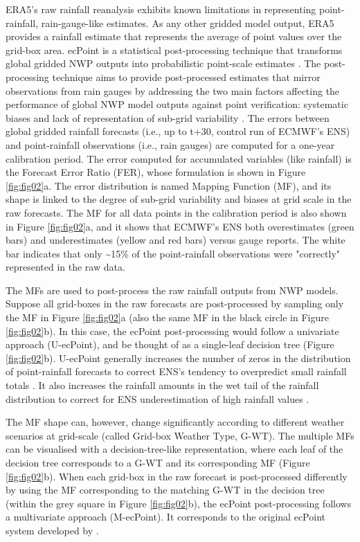 \documentclass{ametsocV6.1}
\begin{document}
ERA5's raw rainfall reanalysis exhibits known limitations in representing point-rainfall, rain-gauge-like estimates. As any other gridded model output, ERA5 provides a rainfall estimate that represents the average of point values over the grid-box area. ecPoint is a statistical post-processing technique that transforms global gridded NWP outputs into probabilistic point-scale estimates \citep{HewsonPillosu2021}. The post-processing technique aims to provide post-processed estimates that mirror observations from rain gauges by addressing the two main factors affecting the performance of global NWP model outputs against point verification: systematic biases \citep{Lavers2021} and lack of representation of sub-grid variability \citep{Gober2008}. The errors between global gridded rainfall forecasts (i.e., up to t+30, control run of ECMWF's ENS) and point-rainfall observations (i.e., rain gauges) are computed for a one-year calibration period. The error computed for accumulated variables (like rainfall) is the Forecast Error Ratio (FER), whose formulation is shown in Figure \ref{fig:fig02}a. The error distribution is named Mapping Function (MF), and its shape is linked to the degree of sub-grid variability and biases at grid scale in the raw forecasts. The MF for all data points in the calibration period is also shown in Figure \ref{fig:fig02}a, and it shows that ECMWF's ENS both overestimates (green bars) and underestimates (yellow and red bars) versus gauge reports. The white bar indicates that only \textasciitilde15\% of the point-rainfall observations were "correctly" represented in the raw data.

The MFs are used to post-process the raw rainfall outputs from NWP models. Suppose all grid-boxes in the raw forecasts are post-processed by sampling only the MF in Figure \ref{fig:fig02}a (also the same MF in the black circle in Figure \ref{fig:fig02}b). In this case, the ecPoint post-processing would follow a univariate approach (U-ecPoint), and be thought of as a single-leaf decision tree (Figure \ref{fig:fig02}b). U-ecPoint generally increases the number of zeros in the distribution of point-rainfall forecasts to correct ENS's tendency to overpredict small rainfall totals \citep{Haiden2025}. It also increases the rainfall amounts in the wet tail of the rainfall distribution to correct for ENS underestimation of high rainfall values \citep{Haiden2025}. 

The MF shape can, however, change significantly according to different weather scenarios at grid-scale (called Grid-box Weather Type, G-WT). The multiple MFs can be visualised with a decision-tree-like representation, where each leaf of the decision tree corresponds to a G-WT and its corresponding MF (Figure \ref{fig:fig02}b). When each grid-box in the raw forecast is post-processed differently by using the MF corresponding to the matching G-WT in the decision tree (within the grey square in Figure \ref{fig:fig02}b), the ecPoint post-processing follows a multivariate approach (M-ecPoint). It corresponds to the original ecPoint system developed by \citet{HewsonPillosu2021}. 
\end{document}
